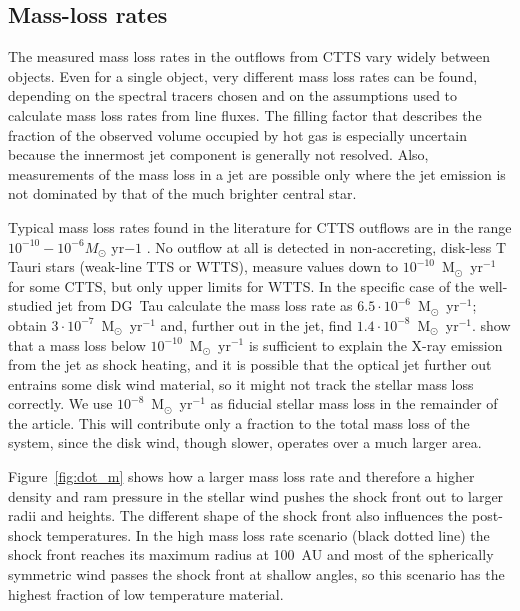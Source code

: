 \subsection{Mass-loss rates}
The measured mass loss rates in the outflows from CTTS vary widely between objects.  Even for a single object, very different mass loss rates can be found, depending on the spectral tracers chosen and on the assumptions used to calculate mass loss rates from line fluxes. The filling factor that describes the fraction of the observed volume occupied by hot gas is especially uncertain because the innermost jet component is generally not resolved. Also, measurements of the mass loss in a jet are possible only where the jet emission is not dominated by that of the much brighter central star. 

Typical mass loss rates found in the literature for CTTS outflows are in the range $10^{-10}-10^{-6}M_{\odot}\textrm{ yr}{-1}$ \citep{1999A&A...342..717B,2006A&A...456..189P}. No outflow at all is detected in non-accreting, disk-less T Tauri stars (weak-line TTS or WTTS), \citet{2006ApJ...646..319E} measure values down to $10^{-10}$~M$_{\odot}$~yr$^{-1}$ for some CTTS, but only upper limits for WTTS. In the specific case of the well-studied jet from DG~Tau \citet{1997A&A...327..671L} calculate the  mass loss rate as $6.5\cdot 10^{-6}$~M$_{\odot}$~yr$^{-1}$; \citet{1995ApJ...452..736H}
obtain $3\cdot 10^{-7}$~M$_{\odot}$~yr$^{-1}$ and, further out in the jet, \citet{2000A&A...356L..41L} find $1.4\cdot 10^{-8}$~M$_{\odot}$~yr$^{-1}$. 
\citet{2009A&A...493..579G} show that a mass loss below $10^{-10}$~M$_{\odot}$~yr$^{-1}$ is sufficient to explain the X-ray emission from the jet as shock heating, and it is possible that the optical jet further out entrains some disk wind material, so it might not track the stellar mass loss correctly.
We use $10^{-8}$~M$_{\odot}$~yr$^{-1}$ as fiducial stellar mass loss in the remainder of the article. This will contribute only a fraction to the total mass loss of the system, since the disk wind, though slower, operates over a much larger area.

Figure~\ref{fig:dot_m} shows how a larger mass loss rate and therefore a higher density and ram pressure in the stellar wind pushes the shock front out to larger radii and heights. The different shape of the shock front also influences the post-shock temperatures. In the high mass loss rate scenario (black dotted line) the shock front reaches its maximum radius at 100~AU and most of the spherically symmetric wind passes the shock front at shallow angles, so this scenario has the highest fraction of low temperature material.
